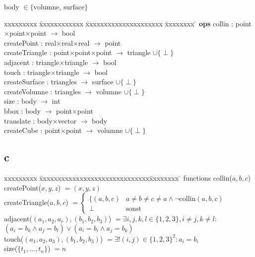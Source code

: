 \documentclass[12pt]{article}
\newcommand{\M}{$\times$}
\newcommand{\rA}{$\rightarrow $ }
\begin{document}
body $\in \{\text{volumne, surface}\}$
\begin{tabbing}
xxxxxxxxx   \= xxxxxxxxxxxx     \= xxxxxxxxxxxxxxxxxxxxx    \= xxxxxxxx \= \kill
\textbf{ops} \> collin          \> : point\M point\M point  \> \rA bool \\
            \> createPoint      \> : real\M real\M real     \> \rA point \\
            \> createTriangle   \> : point\M point\M point  \> \rA triangle $\cup \{\perp\} $   \\
            \> adjacent         \> : triangle\M triangle   \> \rA bool \\
            \> touch            \> : triangle\M triangle    \> \rA bool \\
            \> createSurface    \> : triangles              \> \rA surface $\cup \{\perp\}$     \\
            \> createVolumne    \> : triangles              \> \rA volumne $\cup \{\perp\}$          \\ 
            \> size             \> : body                   \> \rA int \\
            \> bbox             \> : body                   \> \rA point\M point \\
            \> translate        \> : body\M vector          \> \rA body \\
            \> createCube       \> : point\M point          \> \rA volumne $\cup \{\perp\}$ \\
\end{tabbing}


\subsection*{c}

\begin{tabbing}
xxxxxxxxx \= xxxxxxxxxxxxxxxxxxxxxxxxxxxxxx\= xxxxxxxx \= \kill
functions \> 
             collin($a,b,c$)                    \> \\
          \> createPoint($x, y, z$)             \> $= (x, y, z)$ \\           
          \> createTriangle($a, b, c$)          \> $= \begin{cases}\{(a, b, c) & a \not= b \not= c \not= a \wedge \neg \text{collin}(a, b, c) \\ \perp &  \text{sonst} \end{cases}$ \\        
          \> adjacent($(a_1, a_2, a_r), (b_1, b_2, b_3)$) \> $= \exists i, j, k, l \in \{1, 2, 3\}, i \not= j, k \not= l :$ \\ 
          \>                                                \>   $(a_i = b_k \wedge a_j = b_l) \vee (a_i = b_i \wedge a_j = b_k)$ \\     
          \> touch($(a_1, a_2, a_3), (b_1, b_2, b_3)$) \> $=\exists ! (i, j) \in \{1, 2, 3\}^2 : a_i = b_i$ \\
          \> size($\{t_1, \dots , t_n\}$)       \> $=n$ \\
\end{tabbing}
\end{document}
